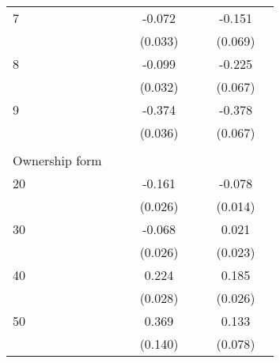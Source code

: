 \begin{longtable}{l*{3}{c}|l*{3}{c}}
	7                   &                     &                     &      -0.072\sym{**} &                     &                     &      -0.151\sym{**} \\
	&                     &                     &     (0.033)         &                     &                     &     (0.069)         \\
	8                   &                     &                     &      -0.099\sym{***}&                     &                     &      -0.225\sym{***}\\
	&                     &                     &     (0.032)         &                     &                     &     (0.067)         \\
	9                   &                     &                     &      -0.374\sym{***}&                     &                     &      -0.378\sym{***}\\
	&                     &                     &     (0.036)         &                     &                     &     (0.067)         \\
	&&&&&&&\\
	Ownership form &&&&&&\\
	20                  &                     &                     &      -0.161\sym{***}&                     &                     &      -0.078\sym{***}\\
	&                     &                     &     (0.026)         &                     &                     &     (0.014)         \\
	30                  &                     &                     &      -0.068\sym{***}&                     &                     &       0.021         \\
	&                     &                     &     (0.026)         &                     &                     &     (0.023)         \\
	40                  &                     &                     &       0.224\sym{***}&                     &                     &       0.185\sym{***}\\
	&                     &                     &     (0.028)         &                     &                     &     (0.026)         \\
	50                  &                     &                     &       0.369\sym{***}&                     &                     &       0.133\sym{*}  \\
	&                     &                     &     (0.140)         &                     &                     &     (0.078)         \\

\end{longtable}
